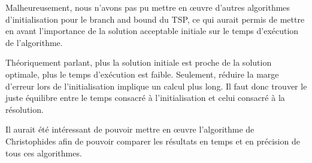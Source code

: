 Malheureusement, nous n'avons pas pu mettre en \oe uvre d'autres algorithmes d'initialisation pour
le branch and bound du TSP, ce qui aurait permis de mettre en avant l'importance de la solution
acceptable initiale sur le temps d'exécution de l'algorithme.

Théoriquement parlant, plus la solution initiale est proche de la solution optimale, plus le temps
d'exécution est faible. Seulement, réduire la marge d'erreur lors de l'initialisation implique un
calcul plus long. Il faut donc trouver le juste équilibre entre le temps consacré à l'initialisation
et celui consacré à la résolution.

Il aurait été intéressant de pouvoir mettre en \oe uvre l'algorithme de Christophides afin de
pouvoir comparer les résultats en temps et en précision de tous ces algorithmes.
